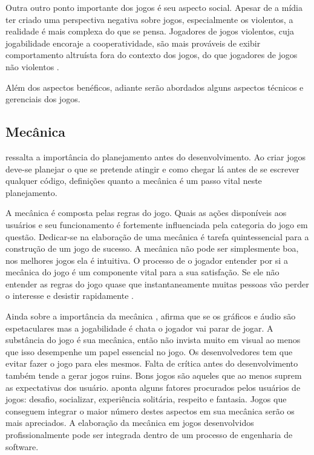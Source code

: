 Outra outro ponto importante dos jogos é seu aspecto social. Apesar de a
mídia ter criado uma perspectiva negativa sobre jogos, especialmente
os violentos, a realidade é mais complexa do que se pensa. Jogadores
de jogos violentos, cuja jogabilidade encoraje a cooperatividade, são
mais prováveis de exibir comportamento altruísta fora do contexto dos
jogos, do que jogadores de jogos não violentos \autocite{gamebenefits}.

Além dos aspectos benéficos, adiante serão abordados alguns aspectos
técnicos e gerenciais dos jogos.

\subsection{Mecânica}

\citet{html5mostwanted} ressalta a importância do planejamento antes
do desenvolvimento. Ao criar jogos deve-se planejar o que se pretende
atingir e como chegar lá antes de se escrever qualquer código,
definições quanto a mecânica é um passo vital neste planejamento.

A mecânica é composta pelas regras do jogo. Quais as ações
disponíveis aos usuários e seu funcionamento é fortemente
influenciada pela categoria do jogo em questão. Dedicar-se na
elaboração de uma mecânica é tarefa quintessencial para a
construção de um jogo de sucesso. A mecânica não pode ser
simplesmente boa, nos melhores jogos ela é intuitiva. O processo de
o jogador entender por si a mecânica do jogo é um componente vital
para a sua satisfação. Se ele não entender as regras do jogo quase
que instantaneamente muitas pessoas vão perder o interesse e desistir
rapidamente \autocite{crossPlatformMobileGame}.

Ainda sobre a importância da mecânica \citet{html5mostwanted}, afirma
que se os gráficos e áudio são espetaculares mas a jogabilidade
é chata o jogador vai parar de jogar. A substância do jogo é
sua mecânica, então não invista muito em visual ao menos que
isso desempenhe um papel essencial no jogo. Os desenvolvedores tem
que evitar fazer o jogo para eles mesmos. Falta de crítica antes
do desenvolvimento também tende a gerar jogos ruins. Bons jogos
são aqueles que ao menos suprem as expectativas dos usuário.
\citet{indieGamesLemes} aponta alguns fatores procurados pelos usuários
de jogos: desafio, socializar, experiência solitária, respeito e
fantasia. Jogos que conseguem integrar o maior número destes aspectos
em sua mecânica serão os mais apreciados. A elaboração da mecânica
em jogos desenvolvidos profissionalmente pode ser integrada dentro de um
processo de engenharia de software.


